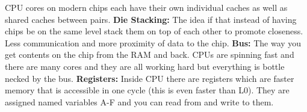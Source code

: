 \documentclass[twoside]{article}
\begin{document}
CPU cores on modern chips each have their own individual caches as well as shared caches between pairs.
\newline
\textbf{Die Stacking:} The idea if that instead of having chips be on the same level stack them on top of each other to promote closeness. Less communication and more proximity of data to the chip. 
\newline
\textbf{Bus:} The way you get contents on the chip from the RAM and back. CPUs are spinning fast and there are many cores and they are all working hard but everything is bottle necked by the bus.  
\newline
\textbf{Registers:} Inside CPU there are registers which are faster memory that is accessible in one cycle (this is even faster than L0). They are assigned named variables A-F and you can read from and write to them. 
\newline
\end{document}
